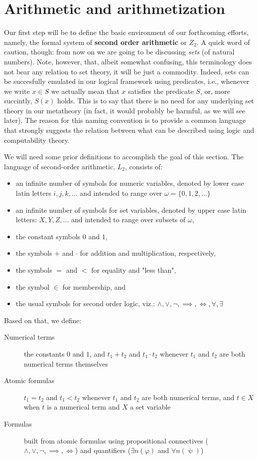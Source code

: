 \documentclass[../main.tex]{memoir}
\begin{document}
\chapter{Arithmetic and arithmetization}

Our first step will be to define the basic environment of our forthcoming efforts, namely, the formal system of \textbf{second order arithmetic} or $Z_2$. A quick word of caution, though: from now on we are going to be discussing \textit{sets} (of natural numbers). Note, however, that, albeit somewhat confusing, this terminology does not bear any relation to set theory, it will be just a commodity. Indeed, sets can be succesfully emulated in our logical framework using predicates, i.e., whenever we write $x \in S$ we actually mean that $x$ satisfies the predicate $S$, or, more succintly, $S(x)$ holds. This is to say that there is no need for any underlying set theory in our metatheory (in fact, it would probably be harmful, as we will see later). The reason for this naming convention is to provide a common language that strongly suggests the relation between what can be described using logic and computability theory.

We will need some prior definitions to accomplish the goal of this section. The language of second-order arithmetic, $L_2$, consists of:

\begin{itemize}
    \item an infinite number of symbols for numeric variables, denoted by lower case latin letters $i, j, k, ...$ and intended to range over $\omega = \{0, 1, 2, ...\}$
    \item an infinite number of symbols for set variables, denoted by upper case latin letters: $X, Y, Z, ...$ and intended to range over subsets of $\omega$,
    \item the constant symbols $0$ and $1$,
    \item the symbols $+$ and $\cdot$ for addition and multiplication, respectively,
    \item the symbols $=$ and $<$ for equality and "less than",
    \item the symbol $\in$ for membership, and
    \item the usual symbols for second order logic, viz.: $\land, \lor, \neg, \implies, \iff, \forall, \exists$
\end{itemize}

Based on that, we define:

\begin{description}
    \item[Numerical terms] the constants $0$ and $1$, and $t_1 + t_2$ and $t_1 \cdot t_2$ whenever $t_1$ and $t_2$ are both numerical terms themselves
    \item[Atomic formulas] $t_1 = t_2$ and $t_1 < t_2$ whenever $t_1$ and $t_2$ are both numerical terms, and $t \in X$ when $t$ is a numerical term and $X$ a set variable
    \item[Formulas] built from atomic formulas using propositional connectives ($\land, \lor, \neg, \implies, \iff$) and quantifiers ($\exists n (\varphi)$ and $\forall n (\uppsi)$)
\end{description}
\end{document}
